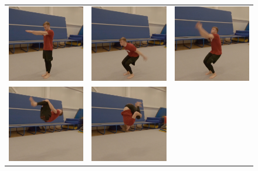 \begin{figure}
   \centering
\begin{tabular}{ccc}
\includegraphics[width=5cm]{images/data-acquisition/example-backflip-part-1}&
\includegraphics[width=5cm]{images/data-acquisition/example-backflip-part-2}&
\includegraphics[width=5cm]{images/data-acquisition/example-backflip-part-3}\\
\includegraphics[width=5cm]{images/data-acquisition/example-backflip-part-4}&
\includegraphics[width=5cm]{images/data-acquisition/example-backflip-part-5}&

\end{tabular}
\end{figure}
